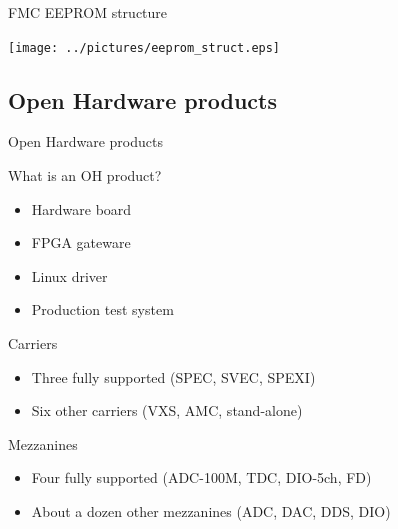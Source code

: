 \documentclass[compress,red]{beamer}
\begin{document}
\begin{frame}{FMC EEPROM structure}

  \begin{center}
    \texttt{[image: ../pictures/eeprom\_struct.eps]}
  \end{center}

\end{frame}



\subsection{Open Hardware products}

\begin{frame}{Open Hardware products}

  \begin{block}{What is an OH product?}
    \begin{itemize}
    \item Hardware board
    \item FPGA gateware
    \item Linux driver
    \item Production test system
    \end{itemize}
  \end{block}

  \begin{block}{Carriers}
    \begin{itemize}
    \item Three fully supported (SPEC, SVEC, SPEXI)
    \item Six other carriers (VXS, AMC, stand-alone)
    \end{itemize}
  \end{block}


  \begin{block}{Mezzanines}
    \begin{itemize}
    \item Four fully supported (ADC-100M, TDC, DIO-5ch, FD)
    \item About a dozen other mezzanines (ADC, DAC, DDS, DIO)
    \end{itemize}
  \end{block}


\end{frame}
\end{document}
